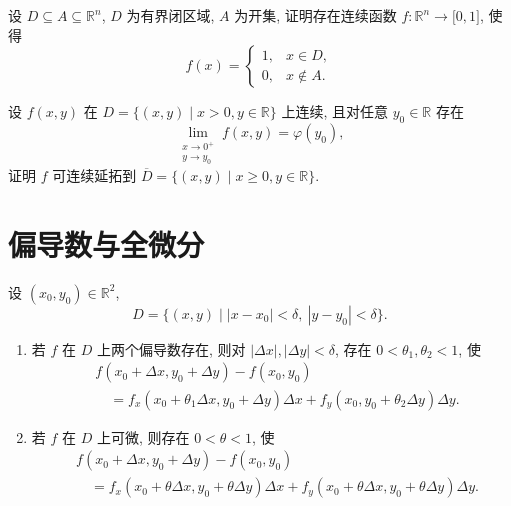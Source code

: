 \documentclass[../数学分析培优讲义.tex]{subfiles}
\begin{document}
\begin{example}
设 $D\subseteq A\subseteq\mathbb{R}^n$, $D$ 为有界闭区域, $A$ 为开集, 证明存在连续函数 $f:\mathbb{R}^n\to\lbrack0,1\rbrack$, 使得
\[
    f(x)=
    \begin{cases}
        1, & x\in D,\\
        0, & x\notin A.
    \end{cases}
\]
\end{example}
\exampleblank

\begin{example}
设 $f(x,y)$ 在 $D=\{(x,y)\mid x>0,y\in\mathbb{R}\}$ 上连续, 且对任意 $y_0\in\mathbb{R}$ 存在
\[
    \lim\limits_{\substack{x\to0^+\\y\to y_0}}f(x,y)=\varphi(y_0),
\]
证明 $f$ 可连续延拓到 $\overline D=\{(x,y)\mid x\geq0,y\in\mathbb{R}\}$.
\end{example}
\exampleblank


\newpage

\section{偏导数与全微分}

\begin{theorem}
设 $(x_0,y_0)\in\mathbb{R}^2$,
\[
    D=\{(x,y)\mid |x-x_0|<\delta,\ |y-y_0|<\delta\}.
\]
\begin{enumerate}[label=(\arabic*)]
    \item 若 $f$ 在 $D$ 上两个偏导数存在, 则对 $|\Delta x|,|\Delta y|<\delta$, 存在 $0<\theta_1,\theta_2<1$, 使
    \[
    \begin{aligned}
        &f(x_0+\Delta x,y_0+\Delta y)-f(x_0,y_0)\\
        &\quad=f_x(x_0+\theta_1\Delta x,y_0+\Delta y)\Delta x
        +f_y(x_0,y_0+\theta_2\Delta y)\Delta y.
    \end{aligned}
    \]
    \item 若 $f$ 在 $D$ 上可微, 则存在 $0<\theta<1$, 使
    \[
    \begin{aligned}
        &f(x_0+\Delta x,y_0+\Delta y)-f(x_0,y_0)\\
        &\quad=f_x(x_0+\theta\Delta x,y_0+\theta\Delta y)\Delta x
        +f_y(x_0+\theta\Delta x,y_0+\theta\Delta y)\Delta y.
    \end{aligned}
    \]
\end{enumerate}
\end{theorem}


\newpage
\end{document}
